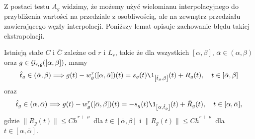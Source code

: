 \documentclass[oik, pdftex, robocza, man]{mgrwms}
\begin{document}
    Z postaci testu $A_{g}$ widzimy, że możemy użyć wielomianu interpolacyjnego do przybliżenia wartości na przedziale z osobliwością, ale na zewnątrz przedziału zawierającego węzły interpolacji. Poniższy lemat opisuje zachowanie błędu takiej ekstrapolacji.

    \begin{lemma} \label{lem:2:2014}
        Istnieją stałe $C$ i $\bar{C}$ zależne od $r$ i $L_{r}$, takie że dla wszystkich $[\alpha, \beta]$, $\bar{\alpha} \in (\alpha, \beta)$ oraz $g \in \mathcal{G}_{r,\varrho}([\alpha,\beta])$, mamy
        \begin{equation*}
            \hat{t}_{g} \in(\bar{\alpha}, \beta) \Longrightarrow g(t)-w_{g}^{r}([\alpha, \bar{\alpha}])(t)=s_{g}(t) \1_{\left[\hat{t}_{g}, \beta\right]}(t)+R_{g}(t), \quad t \in[\bar{\alpha}, \beta]
        \end{equation*}
        oraz
        \begin{equation*}
            \hat{t}_{g} \in (\alpha,\bar{\alpha}) \Longrightarrow g(t)-w_{g}^{r}([\bar{\alpha}, \beta])(t)= -s_{g}(t) \1_{\left[\alpha,\hat{t}_{g}\right]}(t)+\bar{R}_{g}(t), \quad t \in[\alpha,\bar{\alpha}],
        \end{equation*}
        gdzie $\| R_{g}(t) \| \leq C\bar{h}^{r+\varrho}$ dla $t \in [\bar{\alpha}, \beta]$ i $\| \bar{R}_{g}(t) \| \leq \bar{C}\bar{h}^{r+\varrho}$ dla $t \in [\alpha,\bar{\alpha}]$.
    \end{lemma}
\end{document}
